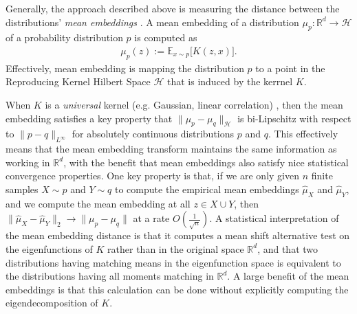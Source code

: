 \documentclass{article}
\newcommand{\comment}[3]{{\color{#1} {\bf #2 :} #3}}
\newcommand{\yoav}[1]{\comment{magenta}{Yoav}{#1}}
\newcommand{\rayan}[1]{\comment{red}{Rayan}{#1}}
\newcommand{\alex}[1]{\comment{green}{Alex}{#1}}
\newcommand{\R}{\mathbb{R}}
\begin{document}

Generally, the approach described above is measuring the distance between the distributions' \emph{mean embeddings} \cite{muandet2017kernel}.  A mean embedding of a distribution $\mu_p:\mathbb{R}^d\rightarrow \mathcal{H}$ of a probability distribution $p$ is computed as
\begin{align*}
    \mu_p(z) := \mathbb{E}_{x\sim p} \big[K(z,x)\big].
\end{align*}
Effectively, mean embedding is mapping the distribution $p$ to a point in the Reproducing Kernel Hilbert Space $\mathcal{H}$ that is induced by the kerrnel $K$.



When $K$ is a \emph{universal} kernel (e.g. Gaussian, linear correlation) \cite{micchelli2006universal}, then the mean embedding satisfies a key property that $\|\mu_p - \mu_q\|_\mathcal{H}$ %
is bi-Lipschitz with respect to $\|p - q\|_{L^{\infty}}$ for absolutely continuous distributions $p$ and $q$.  This effectively means that the mean embedding transform maintains the same information as working in $\R^d$, with the benefit that mean embeddings also satisfy nice statistical convergence properties.  One key property is that, if we are only given $n$ finite samples $X\sim p$ and $Y\sim q$ to compute the empirical mean embeddings $\widehat{\mu}_X$ and $\widehat{\mu}_Y$, and we compute the mean embedding at all $z\in X\cup Y$, then $\|\widehat{\mu}_X - \widehat{\mu}_Y\|_2 \rightarrow \|\mu_p - \mu_q\|$ at a rate $O\left(\frac{1}{\sqrt{n}}\right)$.  A statistical interpretation of the mean embedding distance is that  it computes a mean shift alternative test on the eigenfunctions of $K$ rather than in the original space $\mathbb{R}^d$, and that two distributions having matching means in the eigenfunction space is equivalent to the distributions having all moments matching in $\mathbb{R}^d$.  A large benefit of the mean embeddings is that this calculation can be done without explicitly computing the eigendecomposition of $K$.
\end{document}
